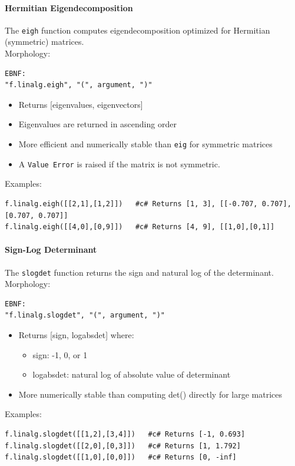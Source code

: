 \paragraph{Hermitian Eigendecomposition}
The \texttt{eigh} function computes eigendecomposition optimized for Hermitian (symmetric) matrices.\\
Morphology:
\begin{verbatim}
EBNF:
"f.linalg.eigh", "(", argument, ")"
\end{verbatim}
\begin{itemize}
\item Returns [eigenvalues, eigenvectors]
\item Eigenvalues are returned in ascending order
\item More efficient and numerically stable than \texttt{eig} for symmetric matrices
\item A \texttt{Value Error} is raised if the matrix is not symmetric.
\end{itemize}
Examples:
\begin{verbatim}
f.linalg.eigh([[2,1],[1,2]])   #c# Returns [1, 3], [[-0.707, 0.707], [0.707, 0.707]]
f.linalg.eigh([[4,0],[0,9]])   #c# Returns [4, 9], [[1,0],[0,1]]
\end{verbatim}

\paragraph{Sign-Log Determinant}
The \texttt{slogdet} function returns the sign and natural log of the determinant.\\
Morphology:
\begin{verbatim}
EBNF:
"f.linalg.slogdet", "(", argument, ")"
\end{verbatim}
\begin{itemize}
\item Returns [sign, logabsdet] where:
  \begin{itemize}
  \item sign: -1, 0, or 1
  \item logabsdet: natural log of absolute value of determinant
  \end{itemize}
\item More numerically stable than computing det() directly for large matrices
\end{itemize}
Examples:
\begin{verbatim}
f.linalg.slogdet([[1,2],[3,4]])   #c# Returns [-1, 0.693]
f.linalg.slogdet([[2,0],[0,3]])   #c# Returns [1, 1.792]
f.linalg.slogdet([[1,0],[0,0]])   #c# Returns [0, -inf]
\end{verbatim}

